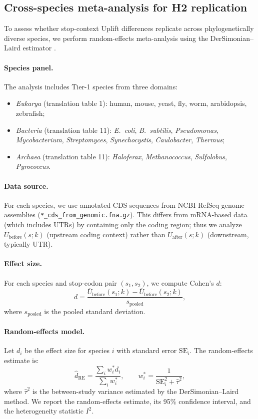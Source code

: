 \subsection{Cross-species meta-analysis for H2 replication}
\label{app:cross_species_meta}

To assess whether stop-context Uplift differences replicate across phylogenetically diverse species, we perform random-effects meta-analysis using the DerSimonian--Laird estimator \cite{DerSimonianLaird1986}.

\paragraph{Species panel.}
The analysis includes Tier-1 species from three domains:
\begin{itemize}
\item \emph{Eukarya} (translation table 1): human, mouse, yeast, fly, worm, arabidopsis, zebrafish;
\item \emph{Bacteria} (translation table 11): \emph{E.~coli}, \emph{B.~subtilis}, \emph{Pseudomonas}, \emph{Mycobacterium}, \emph{Streptomyces}, \emph{Synechocystis}, \emph{Caulobacter}, \emph{Thermus};
\item \emph{Archaea} (translation table 11): \emph{Haloferax}, \emph{Methanococcus}, \emph{Sulfolobus}, \emph{Pyrococcus}.
\end{itemize}

\paragraph{Data source.}
For each species, we use annotated CDS sequences from NCBI RefSeq genome assemblies (\texttt{*\_cds\_from\_genomic.fna.gz}).
This differs from mRNA-based data (which includes UTRs) by containing only the coding region; thus we analyze $\overline{U}_{\mathrm{before}}(s;k)$ (upstream coding context) rather than $\overline{U}_{\mathrm{after}}(s;k)$ (downstream, typically UTR).

\paragraph{Effect size.}
For each species and stop-codon pair $(s_1, s_2)$, we compute Cohen's $d$:
\[
d = \frac{\overline{U}_{\mathrm{before}}(s_1;k) - \overline{U}_{\mathrm{before}}(s_2;k)}{s_{\mathrm{pooled}}},
\]
where $s_{\mathrm{pooled}}$ is the pooled standard deviation.

\paragraph{Random-effects model.}
Let $d_i$ be the effect size for species $i$ with standard error $\mathrm{SE}_i$.
The random-effects estimate is:
\[
\hat{d}_{\mathrm{RE}} = \frac{\sum_i w_i^* d_i}{\sum_i w_i^*},
\qquad w_i^* = \frac{1}{\mathrm{SE}_i^2 + \hat\tau^2},
\]
where $\hat\tau^2$ is the between-study variance estimated by the DerSimonian--Laird method.
We report the random-effects estimate, its 95\% confidence interval, and the heterogeneity statistic $I^2$.

